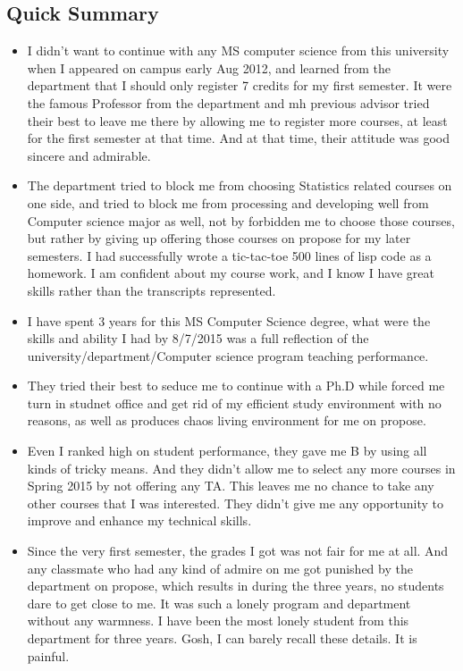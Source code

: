 \documentclass[9pt,b5paper]{article}
\begin{document}
\subsection{Quick Summary}
\label{sec-6-2}
\begin{itemize}
\item I didn't want to continue with any MS computer science from this university when I appeared on campus early Aug 2012, and learned from the department that I should only register 7 credits for my first semester. It were the famous Professor from the department and mh previous advisor tried their best to leave me there by allowing me to register more courses, at least for the first semester at that time. And at that time, their attitude was good sincere and admirable.
\item The department tried to block me from choosing Statistics related courses on one side, and tried to block me from processing and developing well from Computer science major as well, not by forbidden me to choose those courses, but rather by giving up offering those courses on propose for my later semesters. I had successfully wrote a tic-tac-toe 500 lines of lisp code as a homework. I am confident about my course work, and I know I have great skills rather than the transcripts represented.
\item I have spent 3 years for this MS Computer Science degree, what were the skills and ability I had by 8/7/2015 was a full reflection of the university/department/Computer science program teaching performance.
\item They tried their best to seduce me to continue with a Ph.D while forced me turn in studnet office and get rid of my efficient study environment with no reasons, as well as produces chaos living environment for me on propose.
\item Even I ranked high on student performance, they gave me B by using all kinds of tricky means. And they didn't allow me to select any more courses in Spring 2015 by not offering any TA. This leaves me no chance to take any other courses that I was interested. They didn't give me any opportunity to improve and enhance my technical skills.
\item Since the very first semester, the grades I got was not fair for me at all. And any classmate who had any kind of admire on me got punished by the department on propose, which results in during the three years, no students dare to get close to me. It was such a lonely program and department without any warmness. I have been the most lonely student from this department for three years. Gosh, I can barely recall these details. It is painful.

\end{itemize}
\end{document}
